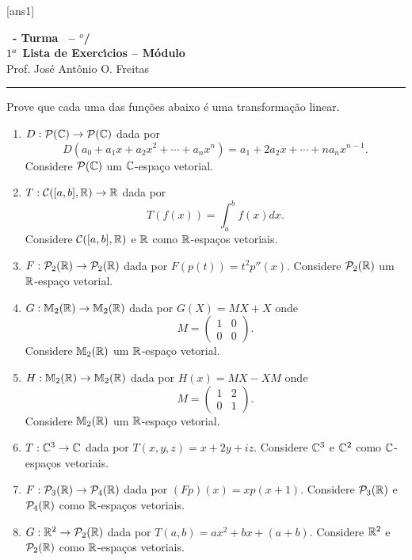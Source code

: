 \documentclass[12pt]{exam}
\begin{document}
  [ans1]
  \begin{center}
    {\Large\bf \disciplina\ - Turma \turma\ -- \semestre$^{o}$/\ano} \\ \vspace{9pt} {\large\bf
        $1^a$ Lista de Exerc{\'\i}cios -- Módulo \numeromodulo}\\ \vspace{9pt} Prof. Jos{\'e} Ant{\^o}nio O. Freitas
  \end{center}
  \hrule


\begin{exercicio}
  Prove que cada uma das fun\c{c}\~oes abaixo \'e uma transforma\c{c}\~ao linear.
  \begin{enumerate}[label=({\alph*})]
    \item $D : \mathcal{P}(\mathbb{C}) \to \mathcal{P}(\mathbb{C})$ dada por
    \[
    D(a_0 + a_1x + a_2x^2 + \cdots + a_nx^n) = a_1 + 2a_2x + \cdots + na_nx^{n - 1}.
    \]
    Considere $\mathcal{P}(\mathbb{C})$ um $\mathbb{C}$-espa\c{c}o vetorial.
    \item $T : \mathcal{C}([a,b], \mathbb{R}) \to \mathbb{R}$ dada por
    \[
    T(f(x)) = \int_a^bf(x)dx.
    \]
    Considere $\mathcal{C}([a,b], \mathbb{R})$ e $\mathbb{R}$ como $\mathbb{R}$-espa\c{c}os vetoriais.
    \item $F : \mathcal{P}_2(\mathbb{R}) \to \mathcal{P}_2(\mathbb{R})$ dada por $F(p(t)) = t^2p''(x)$. Considere $\mathcal{P}_2(\mathbb{R})$ um $\mathbb{R}$-espa\c{c}o vetorial.
    \item $G : \mathbb{M}_2(\mathbb{R}) \to \mathbb{M}_2(\mathbb{R})$ dada por $G(X) = MX + X$ onde
    \[
    M = \begin{pmatrix}
      1 & 0\\
      0 & 0
    \end{pmatrix}.
    \]
    Considere $\mathbb{M}_2(\mathbb{R})$ um $\mathbb{R}$-espa\c{c}o vetorial.
    \item $H : \mathbb{M}_2(\mathbb{R}) \to \mathbb{M}_2(\mathbb{R})$ dada por $H(x) = MX - XM$ onde
    \[
    M = \begin{pmatrix}
      1 & 2\\
      0 & 1
    \end{pmatrix}.
    \]
    Considere $\mathbb{M}_2(\mathbb{R})$ um $\mathbb{R}$-espa\c{c}o vetorial.
    
    \item $T : \mathbb{C}^3 \to \mathbb{C}$ dada por $T(x,y,z) = x + 2y + iz$. Considere $\mathbb{C}^3$ e $\mathbb{C}^2$ como $\mathbb{C}$-espa\c{c}os vetoriais.
    \item $F : \mathcal{P}_3(\mathbb{R}) \to \mathcal{P}_4(\mathbb{R})$ dada por $(Fp)(x) = xp(x + 1)$. Considere $\mathcal{P}_3(\mathbb{R})$ e $\mathcal{P}_4(\mathbb{R})$ como $\mathbb{R}$-espa\c{c}os vetoriais.
    \item $G : \mathbb{R}^2 \to \mathcal{P}_2(\mathbb{R})$ dada por $T(a,b) = ax^2 + bx + (a + b)$. Considere $\mathbb{R}^2$ e $\mathcal{P}_2(\mathbb{R})$ como $\mathbb{R}$-espa\c{c}os vetoriais.
  \end{enumerate}
\end{exercicio}
\end{document}

